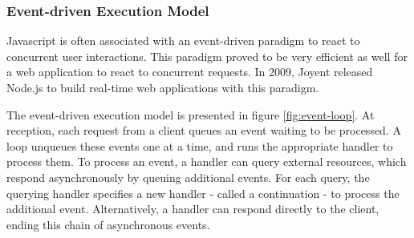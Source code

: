 \subsubsection{Event-driven Execution Model} \label{chapter2:web-as-a-platform:javascript:event-loop}

Java\-script is often associated with an event-driven para\-digm to react to concurrent user interactions.
This para\-digm proved to be very efficient as well for a web application to react to concurrent requests.
In 2009, Joyent released Node.js to build real-time web applications with this para\-digm.

\begin{figure}
\end{figure}

The event-driven execution model is presented in figure \ref{fig:event-loop}.
At reception, each request from a client queues an event waiting to be processed.
A loop unqueues these events one at a time, and runs the appropriate handler to process them.
To process an event, a handler can query external resources, which respond asynchronously by queuing additional events.
For each query, the querying handler specifies a new handler - called a continuation - to process the additional event.
Alternatively, a handler can respond directly to the client, ending this chain of asynchronous events.


